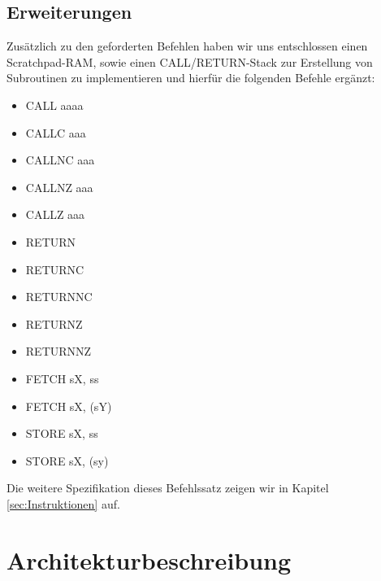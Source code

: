 \documentclass[bibliography=totoc,listof=totoc,index=totoc]{scrartcl}
\begin{document}
\subsection{Erweiterungen}
Zusätzlich zu den geforderten Befehlen haben wir uns entschlossen einen Scratchpad-RAM, sowie einen CALL/RETURN-Stack zur Erstellung von Subroutinen zu implementieren und hierfür die folgenden Befehle ergänzt:
\begin{multicols}{3}
\begin{itemize}
    \item CALL aaaa
    \item CALLC aaa
    \item CALLNC aaa
    \item CALLNZ aaa
    \item CALLZ aaa
    \item RETURN
    \item RETURNC
    \item RETURNNC
    \item RETURNZ
    \item RETURNNZ
    \item FETCH sX, ss
    \item FETCH sX, (sY)
    \item STORE sX, ss
    \item STORE sX, (sy)
\end{itemize}
\end{multicols}

Die weitere Spezifikation dieses Befehlssatz zeigen wir in Kapitel \ref{sec:Instruktionen} auf.

\section{Architekturbeschreibung}\label{sec:Architekturbeschreibung}
\end{document}
